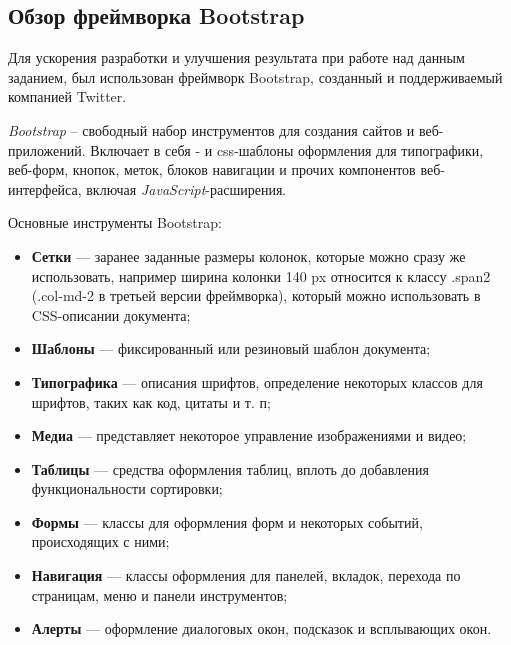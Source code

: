 \subsection{Обзор фреймворка Bootstrap}\label{theory:bootstrap}

Для ускорения разработки и улучшения результата при работе над данным заданием, был использован фреймворк Bootstrap, созданный и поддерживаемый компанией Twitter.

\textit{Bootstrap} -- свободный набор инструментов для создания сайтов и веб-приложений. Включает в себя - и \gls{css}-шаблоны оформления для типографики, веб-форм, кнопок, меток, блоков навигации и прочих компонентов веб-интерфейса, включая \textit{JavaScript}-расширения\cite{wiki:bootstrap}. 

Основные инструменты Bootstrap:
\begin{itemize}
	\item \textbf{Сетки} — заранее заданные размеры колонок, которые можно сразу же использовать, например ширина колонки 140 px относится к классу .span2 (.col-md-2 в третьей версии фреймворка), который можно использовать в CSS-описании документа;
	\item \textbf{Шаблоны} — фиксированный или резиновый шаблон документа;
	\item \textbf{Типографика} — описания шрифтов, определение некоторых классов для шрифтов, таких как код, цитаты и т. п;
	\item \textbf{Медиа} — представляет некоторое управление изображениями и видео;
	\item \textbf{Таблицы} — средства оформления таблиц, вплоть до добавления функциональности сортировки;
	\item \textbf{Формы} — классы для оформления форм и некоторых событий, происходящих с ними;
	\item \textbf{Навигация} — классы оформления для панелей, вкладок, перехода по страницам, меню и панели инструментов;
	\item \textbf{Алерты} — оформление диалоговых окон, подсказок и всплывающих окон.
\end{itemize}

